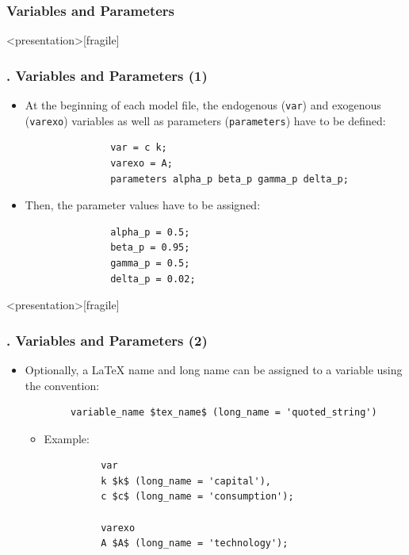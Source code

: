 \documentclass[11pt,aspectratio=169]{beamer}
\begin{document}
\subsubsection{Variables and Parameters}
\begin{frame}<presentation>[fragile]
	\frametitle{{\thesection.\thesubsection\thinspace\thesubsubsection} Variables and Parameters (1)}
	\begin{itemize}
		\item At the beginning of each model file, the endogenous (\texttt{var}) and exogenous (\texttt{varexo}) variables as well as parameters (\texttt{parameters}) have to be defined:
			\begin{verbatim}
			   var = c k;		
			   varexo = A;		
			   parameters alpha_p beta_p gamma_p delta_p;	
			\end{verbatim}	
		\item Then, the parameter values have to be assigned:
			\begin{verbatim}				
			   alpha_p = 0.5;
			   beta_p = 0.95;
			   gamma_p = 0.5;
			   delta_p = 0.02;
			\end{verbatim}
	\end{itemize}
\end{frame}
\begin{frame}<presentation>[fragile]
	\frametitle{{\thesection.\thesubsection\thinspace\thesubsubsection} Variables and Parameters (2)}
	\begin{itemize}
		\item Optionally, a LaTeX name and long name can be assigned to a variable using the convention:\\ 
		\begin{verbatim}
		variable_name $tex_name$ (long_name = 'quoted_string') \end{verbatim}
		\begin{itemize}
			\item Example:
		\begin{verbatim}
		  var 
		  k $k$ (long_name = 'capital'),
		  c $c$ (long_name = 'consumption');
		  
		  varexo 
		  A $A$ (long_name = 'technology');
		\end{verbatim}
		\end{itemize}
	\end{itemize}
\end{frame}
\end{document}
